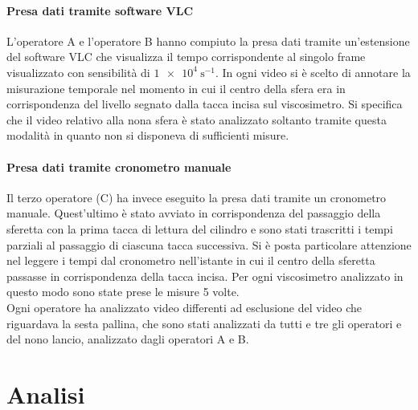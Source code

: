 \documentclass[a4paper,11pt,oneside]{article}
\begin{document}
\paragraph{Presa dati tramite software VLC}
L'operatore A e l'operatore B hanno compiuto la presa dati tramite un'estensione del software VLC che visualizza il tempo corrispondente al singolo frame visualizzato con sensibilità di $\SI{1e4}{\second^{-1}}$. In ogni video si è scelto di annotare la misurazione temporale nel momento in cui il centro della sfera era in corrispondenza del livello segnato dalla tacca incisa sul viscosimetro. Si specifica che il video relativo alla nona sfera è stato analizzato soltanto tramite questa modalità in quanto non si disponeva di sufficienti misure.

\paragraph{Presa dati tramite cronometro manuale}
Il terzo operatore (C) ha invece eseguito la presa dati tramite un cronometro manuale. Quest'ultimo è stato avviato in corrispondenza del passaggio della sferetta con la prima tacca di lettura del cilindro e sono stati trascritti i tempi parziali al passaggio di ciascuna tacca successiva. Si è posta particolare attenzione nel leggere i tempi dal cronometro nell'istante in cui il centro della sferetta passasse in corrispondenza della tacca incisa. Per ogni viscosimetro analizzato in questo modo sono state prese le misure 5 volte.\\ \newline
Ogni operatore ha analizzato video differenti ad esclusione del video che riguardava la sesta pallina, che sono stati analizzati da tutti e tre gli operatori e del nono lancio, analizzato dagli operatori A e B.

\section{Analisi}
\end{document}
